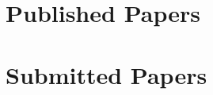 \newpage

\section{Published Papers}
\label{sec:app-pub}





\newpage

\section{Submitted Papers}
\label{sec:app-sub}



